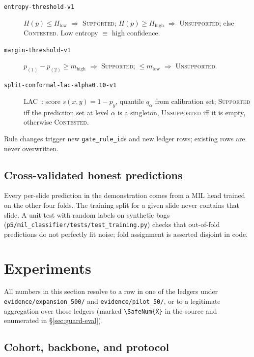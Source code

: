 \documentclass{article}
\begin{document}
\begin{description}
    \item[\texttt{entropy-threshold-v1}] $H(p) \le H_{\text{low}}$ $\Rightarrow$ \textsc{Supported}; $H(p) \ge H_{\text{high}}$ $\Rightarrow$ \textsc{Unsupported}; else \textsc{Contested}. Low entropy $\equiv$ high confidence.
    \item[\texttt{margin-threshold-v1}] $p_{(1)} - p_{(2)} \ge m_{\text{high}}$ $\Rightarrow$ \textsc{Supported}; $\le m_{\text{low}}$ $\Rightarrow$ \textsc{Unsupported}.
    \item[\texttt{split-conformal-lac-alpha0.10-v1}] LAC~\citep{sadinle2019least}: score $s(x,y) = 1 - p_y$, quantile $q_{\alpha}$ from calibration set; \textsc{Supported} iff the prediction set at level $\alpha$ is a singleton, \textsc{Unsupported} iff it is empty, otherwise \textsc{Contested}.
\end{description}

Rule changes trigger new \texttt{gate\_rule\_id}s and new ledger rows; existing rows are never overwritten.

\subsection{Cross-validated honest predictions}

Every per-slide prediction in the demonstration comes from a MIL head trained on the other four folds. The training split for a given slide never contains that slide. A unit test with random labels on synthetic bags (\texttt{p5/mil\_classifier/tests/test\_training.py}) checks that out-of-fold predictions do not perfectly fit noise; fold assignment is asserted disjoint in code.

\section{Experiments}
\label{sec:exp}

All numbers in this section resolve to a row in one of the ledgers under \texttt{evidence/expansion\_500/} and \texttt{evidence/pilot\_50/}, or to a legitimate aggregation over those ledgers (marked \texttt{\textbackslash SafeNum\{X\}} in the source and enumerated in \S\ref{sec:guard-eval}).

\subsection{Cohort, backbone, and protocol}
\label{sec:cohort}
\end{document}
